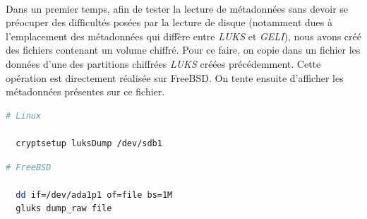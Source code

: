 \paragraph{}
Dans un premier temps, afin de tester la lecture de métadonnées sans devoir se
préocuper des difficultés posées par la lecture de disque (notamment dues à
l'emplacement des métadonnées qui diffère entre \textit{LUKS} et \textit{GELI}),
nous avons créé des fichiers contenant un volume chiffré. Pour ce faire, on
copie dans un fichier les données d'une des partitions chiffrées \textit{LUKS}
créées précédemment. Cette opération est directement réalisée sur FreeBSD. On
tente ensuite d'afficher les métadonnées présentes sur ce fichier.
\\
\begin{lstlisting}[language=bash]
  # Linux

  cryptsetup luksDump /dev/sdb1
\end{lstlisting}
\begin{lstlisting}[language=bash]
  # FreeBSD
  
  dd if=/dev/ada1p1 of=file bs=1M
  gluks dump_raw file
\end{lstlisting}
